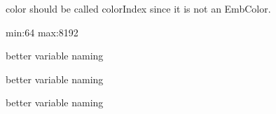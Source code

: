 
\begin{DoxyRefList}
\item[Global \mbox{\hyperlink{embroidery_8h_ae92ded87da0dcaaae8f7c7bc880fd1b0}{Emb\+Stitch}} ]\label{todo__todo000002}%
%
{\ttfamily color} should be called color\+Index since it is not an Emb\+Color.  
\item[Global \mbox{\hyperlink{designs_8c_a780a8be3791541ccfc2dcadd269151d2}{heart4}} ]\label{todo__todo000001}%
%
min\+:64 max\+:8192  
\item[Global \mbox{\hyperlink{structSubDescriptor___a38fd406a9a90eadf0a7493f544c96936}{Sub\+Descriptor\+\_\+\+::color\+Code}} ]\label{todo__todo000005}%
%
better variable naming  
\item[Global \mbox{\hyperlink{structSubDescriptor___ac51ebc277f92c038a85467cc77ad3fcb}{Sub\+Descriptor\+\_\+\+::some\+Int}} ]\label{todo__todo000003}%
%
better variable naming  
\item[Global \mbox{\hyperlink{structSubDescriptor___ad2373ecaa71179dccd7d10a4b8c48cb7}{Sub\+Descriptor\+\_\+\+::some\+Other\+Int}} ]\label{todo__todo000004}%
%
better variable naming 
\end{DoxyRefList}